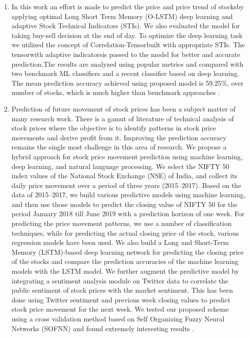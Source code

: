 \documentclass[12pt,journal,compsoc]{IEEEtran}
\begin{document}
\begin{enumerate}
	\item In  this  work  an effort  is  made  to  predict  the  price  and  price  trend  of  stocksby applying  optimal  Long  Short  Term  Memory  (O-LSTM)  deep learning and adaptive Stock Technical Indicators (STIs). We also evaluated the model for taking buy-sell decision at the end of day. To  optimize  the  deep  learning  task  we  utilized  the  concept  of Correlation-Tensorbuilt  with  appropriate  STIs.  The  tensorwith adaptive indicatorsis passed to the model for better and accurate prediction.The  results  are  analyzed  using  popular  metrics  and compared  with  two  benchmark  ML  classifiers  and  a  recent classifier based on deep learning. The mean prediction accuracy achieved using proposed model is 59.25\%, over number of stocks, which is much higher than benchmark approaches \cite{agrawal2019stock}.
	
	\item Prediction of future movement of stock prices has been a subject matter of many research work. There is a gamut of literature of technical analysis of stock prices where the objective is to identify patterns in stock price movements and derive profit from it. Improving the prediction accuracy remains the single most challenge in this area of research. We propose a hybrid approach for stock price movement prediction using machine learning, deep learning, and natural language processing. We select the NIFTY 50 index values of the National Stock Exchange (NSE) of India, and collect its daily price movement over a period of three years (2015–2017). Based on the data of 2015–2017, we build various predictive models using machine learning, and then use those models to predict the closing value of NIFTY 50 for the period January 2018 till June 2019 with a prediction horizon of one week. For predicting the price movement patterns, we use a number of classification techniques, while for predicting the actual closing price of the stock, various regression models have been used. We also build a Long and Short-Term Memory (LSTM)-based deep learning network for predicting the closing price of the stocks and compare the prediction accuracies of the machine learning models with the LSTM model. We further augment the predictive model by integrating a sentiment analysis module on Twitter data to correlate the public sentiment of stock prices with the market sentiment. This has been done using Twitter sentiment and previous week closing values to predict stock price movement for the next week. We tested our proposed scheme using a cross validation method based on Self Organizing Fuzzy Neural Networks (SOFNN) and found extremely interesting results \cite{mehtab2019robust}. 
	

\end{enumerate}
\end{document}
